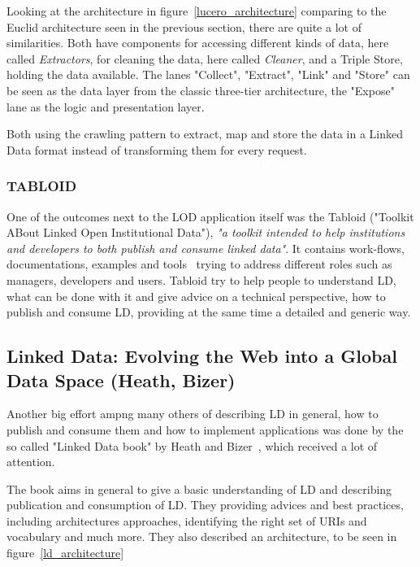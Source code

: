 Looking at the architecture in figure~\ref{lucero_architecture} comparing to the Euclid architecture seen in the previous section, there are quite a lot of similarities. Both have components for accessing different kinds of data, here called \emph{Extractors}, for cleaning the data, here called \emph{Cleaner}, and a Triple Store, holding the data available. The lanes "Collect", "Extract", "Link" and "Store" can be seen as the data layer from the classic three-tier architecture, the "Expose" lane as the logic and presentation layer. 

Both using the crawling pattern to extract, map and store the data in a Linked Data format instead of transforming them for every request.

\subsubsection{TABLOID}
One of the outcomes next to the LOD application itself was the Tabloid ("Toolkit ABout Linked Open Institutional Data"), \emph{"a toolkit intended to help institutions and developers to both publish and consume linked data"}. It contains work-flows, documentations, examples and tools~\cite{lucero:tabloid} trying to address different roles such as managers, developers and users. Tabloid try to help people to understand LD, what can be done with it and give advice on a technical perspective, how to publish and consume LD, providing at the same time a detailed and generic way.

\subsection{Linked Data: Evolving the Web into a Global Data Space (Heath, Bizer)}

Another big effort ampng many others of describing LD in general, how to publish and consume them and how to implement applications was done by the so called "Linked Data book" by Heath and Bizer~\cite{heath2011linked}, which received a lot of attention.

The book aims in general to give a basic understanding of LD and describing publication and consumption of LD. They providing advices and best practices, including architectures approaches, identifying the right set of URIs and vocabulary and much more. They also described an architecture, to be seen in figure~\ref{ld_architecture}

